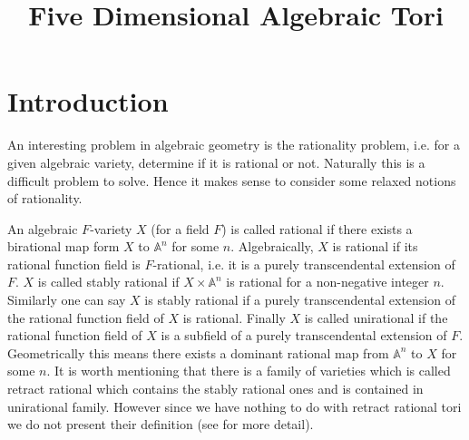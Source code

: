 \documentclass[12pt]{article}
\title{Five Dimensional Algebraic Tori}
\theoremstyle{plain}
\theoremstyle{definition}
\begin{document}
\maketitle
{}
  
  
\section{Introduction}
An interesting problem in algebraic geometry is the rationality problem, i.e. 
for a given algebraic variety, determine if it is rational or not. Naturally 
this is a difficult problem to solve. Hence it makes sense to consider some 
relaxed notions of rationality. 

An algebraic $F$-variety $X$ (for a field $F$) is called rational if there exists a birational map 
form $X$ to $\mathbb{A}^n$ for some $n$. Algebraically, $X$ is rational if 
its rational function field is $F$-rational, i.e. it is a purely 
transcendental extension of $F$. $X$ is called stably rational if $X \times 
\mathbb{A}^n$ is rational for a non-negative integer $n$. Similarly one can say $X$ is stably rational if 
a purely transcendental extension of the rational function field of $X$ is 
rational. Finally $X$ is called unirational if the rational function field of 
$X$ is a subfield of a purely transcendental extension of $F$. Geometrically 
this means there exists a dominant rational map from $\mathbb{A}^n$ to $X$ for
some $n$. It is worth mentioning that there is a family of varieties which is
called retract rational which contains the stably rational ones and is contained in 
unirational family. However since we have nothing to do with retract rational tori we 
do not present their definition (see \cite{Hoshi} for more detail).
\end{document}
